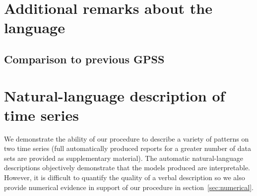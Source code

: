 \documentclass{article}
\begin{document}
\section{Additional remarks about the language}


\subsection{Comparison to previous GPSS}






\section{Natural-language description of time series}
\label{sec:examples}
We demonstrate the ability of our procedure to describe a variety of patterns on two time series (full automatically produced reports for a greater number of data sets are provided as supplementary material).
The automatic natural-language descriptions objectively demonstrate that the models produced are interpretable.
However, it is difficult to quantify the quality of a verbal description so we also provide numerical evidence in support of our procedure in section~\ref{sec:numerical}.
\end{document}
